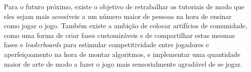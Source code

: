 \documentclass[conference]{IEEEtran}
\begin{document}
Para o futuro próximo, existe o objetivo de retrabalhar os tutoriais de modo que eles sejam mais acessíveis a um número maior de pessoas na hora de ensinar como jogar o jogo. Também existe a ambição de colocar artifícios de comunidade, como uma forma de criar fases customizáveis e de compartilhar estas mesmas fases e \textit{leaderboards} para estimular competitividade entre jogadores e aperfeiçoamento na hora de montar algoritmos, e implementar uma quantidade maior de arte de modo a fazer o jogo mais sensorialmente agradável de se jogar.



\end{document}

